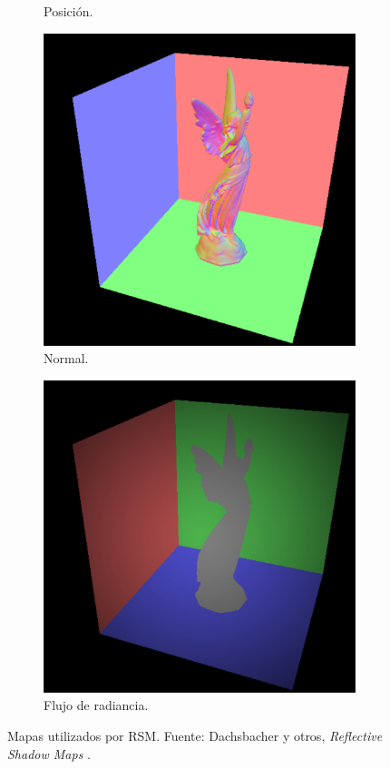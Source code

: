 \begin{figure}[H]
\begin{subfigure}[t]{.24\linewidth}
		\caption*{Posición.}
	\end{subfigure}
	\begin{subfigure}[t]{.24\linewidth}
		\centering
		\captionsetup{justification=centering}
		\includegraphics[width=\linewidth]{media/rsmn.png}
		\caption*{Normal.}
	\end{subfigure}
	\begin{subfigure}[t]{.24\linewidth}
		\centering
		\captionsetup{justification=centering}
		\includegraphics[width=\linewidth]{media/rsmf.png}
		\caption*{Flujo de radiancia.}
	\end{subfigure}
	\caption{Mapas utilizados por \ac{RSM}. Fuente: Dachsbacher y otros, \emph{Reflective Shadow Maps} \cite{Dachsbacher:2005}.}
	\label{fig:rsm_fbo}
\end{figure}

